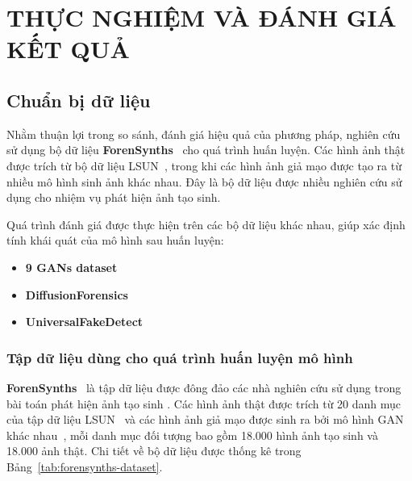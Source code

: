 \chapter{THỰC NGHIỆM VÀ ĐÁNH GIÁ KẾT QUẢ}
\label{Chapter4}
\section{Chuẩn bị dữ liệu}
Nhằm thuận lợi trong so sánh, đánh giá hiệu quả của phương pháp, nghiên cứu sử dụng bộ dữ liệu \textbf{ForenSynths}~\cite{Wang2019CNNGeneratedIA} cho quá trình huấn luyện. Các hình ảnh thật được trích từ bộ dữ liệu LSUN~\cite{Yu2015ConstructionOA}, trong khi các hình ảnh giả mạo được tạo ra từ nhiều mô hình sinh ảnh khác nhau. Đây là bộ dữ liệu được nhiều nghiên cứu sử dụng cho nhiệm vụ phát hiện ảnh tạo sinh.

Quá trình đánh giá được thực hiện trên các bộ dữ liệu khác nhau, giúp xác định tính khái quát của mô hình sau huấn luyện:
\begin{itemize}
	\item \textbf{9 GANs dataset}~\cite{Yu2015ConstructionOA}
	\item \textbf{DiffusionForensics}~\cite{Wang2023DIREFD}
	\item \textbf{UniversalFakeDetect}~\cite{Ojha2023TowardsUF}
\end{itemize}

\subsection{Tập dữ liệu dùng cho quá trình huấn luyện mô hình}
\textbf{ForenSynths}~\cite{Wang2019CNNGeneratedIA} là tập dữ liệu được đông đảo các nhà nghiên cứu sử dụng trong bài toán phát hiện ảnh tạo sinh \cite{Wang2019CNNGeneratedIA,Tan2023RethinkingTU,Ojha2023TowardsUF,zhong2024patchcraftexploringtexturepatch}.
%
Các hình ảnh thật được trích từ 20 danh mục của tập dữ liệu LSUN~\cite{Yu2015LSUNCO} và các hình ảnh giả mạo được sinh ra bởi mô hình GAN khác nhau~\cite{Goodfellow2014GenerativeAN}, mỗi danh mục đối tượng bao gồm 18.000 hình ảnh tạo sinh và 18.000 ảnh thật. Chi tiết về bộ dữ liệu được thống kê trong Bảng~\ref{tab:forensynths-dataset}.



